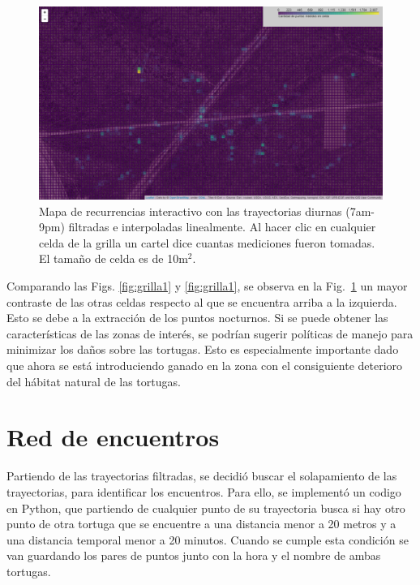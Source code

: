 \begin{figure}[ht]
    \begin{center}
        
    
    \includegraphics[width=\imsize]{Chap2/GrillaCintSNoche.png}
\end{center}
    \caption[Mapa con zona de recurrencia para trayectorias diurnas.]{Mapa de recurrencias  interactivo con las trayectorias diurnas (7am-9pm) filtradas e interpoladas linealmente. Al hacer clic en cualquier celda de la grilla un cartel dice cuantas mediciones fueron tomadas. El tamaño de celda es de 10m$^2$.}
    \label{fig:grillaInt}
\end{figure}
 
Comparando las Figs. \ref{fig:grilla1} y \ref{fig:grilla1}, se observa en la  Fig.~\ref{fig:grillaInt} un mayor contraste de las otras celdas respecto al que se encuentra arriba a la izquierda. Esto se debe a la extracción de los puntos nocturnos.  Si se puede obtener las características de las zonas de interés, se podrían sugerir políticas de manejo para minimizar los daños sobre las tortugas. Esto es especialmente importante dado que ahora se está introduciendo ganado en la zona con el consiguiente deterioro del hábitat natural de las tortugas.

\section{Red de encuentros}
Partiendo de las trayectorias filtradas, se decidió buscar el solapamiento de las trayectorias, para identificar los encuentros. Para ello, se implementó un codigo en Python, que partiendo de cualquier punto de su trayectoria busca si hay otro punto de otra tortuga que se encuentre a una distancia menor a 20 metros y a una distancia temporal menor a 20 minutos. Cuando se cumple esta condición se van guardando los pares de puntos junto con la hora y el nombre de ambas tortugas.

